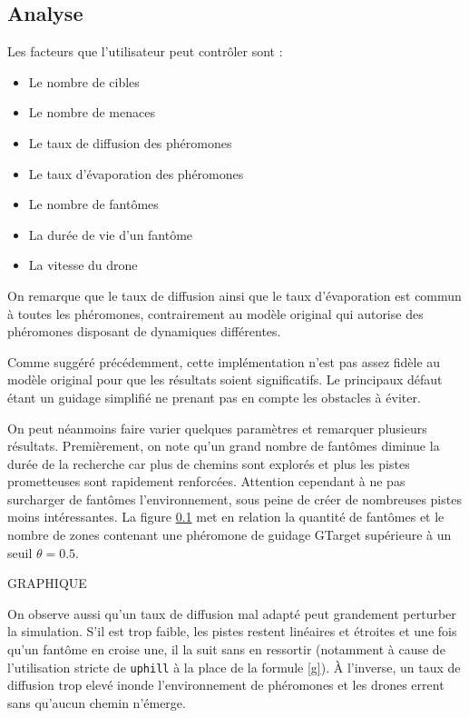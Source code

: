 \documentclass[12pt]{article}
\begin{document}
\subsection{Analyse}

Les facteurs que l'utilisateur peut contrôler sont :

\begin{itemize}
\item{Le nombre de cibles}
\item{Le nombre de menaces}
\item{Le taux de diffusion des phéromones}
\item{Le taux d'évaporation des phéromones}
\item{Le nombre de fantômes}
\item{La durée de vie d'un fantôme}
\item{La vitesse du drone}
\end{itemize}

On remarque que le taux de diffusion ainsi que le taux d'évaporation
est commun à toutes les phéromones, contrairement au modèle original
qui autorise des phéromones disposant de dynamiques différentes.

Comme suggéré précédemment, cette implémentation n'est pas assez
fidèle au modèle original pour que les résultats soient
significatifs. Le principaux défaut étant un guidage simplifié ne
prenant pas en compte les obstacles à éviter.

On peut néanmoins faire varier quelques paramètres et remarquer
plusieurs résultats. Premièrement, on note qu'un grand nombre de
fantômes diminue la durée de la recherche car plus de chemins sont
explorés et plus les pistes prometteuses sont rapidement renforcées.
Attention cependant à ne pas surcharger de fantômes l'environnement,
sous peine de créer de nombreuses pistes moins intéressantes. La
figure \ref{} met en relation la quantité de fantômes et le nombre de
zones contenant une phéromone de guidage GTarget supérieure à un
seuil $\theta = 0.5$.

GRAPHIQUE

On observe aussi qu'un taux de diffusion mal adapté peut grandement
perturber la simulation. S'il est trop faible, les pistes restent
linéaires et étroites et une fois qu'un fantôme en croise une, il la
suit sans en ressortir (notamment à cause de l'utilisation stricte de
\texttt{uphill} à la place de la formule \ref{g}). \`A l'inverse, un
taux de diffusion trop elevé inonde l'environnement de phéromones et
les drones errent sans qu'aucun chemin n'émerge.
\end{document}
